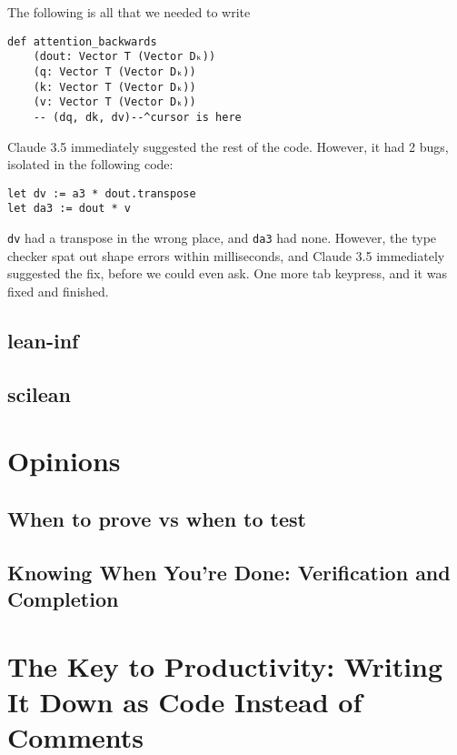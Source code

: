 \documentclass{article}
\begin{document}
The following is all that we needed to write

\begin{verbatim}
def attention_backwards
    (dout: Vector T (Vector Dₖ))
    (q: Vector T (Vector Dₖ))
    (k: Vector T (Vector Dₖ))
    (v: Vector T (Vector Dₖ))
    -- (dq, dk, dv)--^cursor is here
\end{verbatim}

Claude 3.5 immediately suggested the rest of the code. However, it had 2 bugs, isolated in the following code:

\begin{verbatim}
let dv := a3 * dout.transpose
let da3 := dout * v
\end{verbatim}

\texttt{dv} had a transpose in the wrong place, and \texttt{da3} had none. However, the type checker spat out shape errors within milliseconds, and Claude 3.5 immediately suggested the fix, before we could even ask. One more tab keypress, and it was fixed and finished.

\subsection{lean-inf}

\subsection{scilean}

\section{Opinions}
\subsection{When to prove vs when to test}
\subsection{Knowing When You're Done: Verification and Completion}

\section{The Key to Productivity: Writing It Down as Code Instead of Comments}
\end{document}
